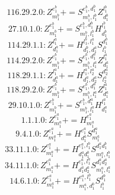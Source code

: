\documentclass[letterpaper,10pt,fleqn,leqno,onecolumn]{article}
\begin{document}
\begin{equation} \;\;\;\;\;\;  116.29.2.0: Z^{e_{1}^{b}}_{m_{1}^{b}}+=S^{e_{1}^{b},d_{1}^{b}}_{m_{1}^{b},l_{1}^{b}}Z^{l_{1}^{b}}_{d_{1}^{b}} \end{equation}
\begin{equation} \;\;\;\;\;\;  27.10.1.0: Z^{e_{1}^{b}}_{m_{1}^{b}}+=S^{e_{1}^{b},d_{1}^{b}}_{m_{1}^{b},l_{1}^{b}}H^{l_{1}^{b}}_{d_{1}^{b}} \end{equation}
\begin{equation} \;\;\;\;\;\;  114.29.1.1: Z^{l_{1}^{a}}_{d_{1}^{a}}+=H^{l_{1}^{b},l_{1}^{a}}_{d_{1}^{b},d_{1}^{a}}S^{d_{1}^{b}}_{l_{1}^{b}} \end{equation}
\begin{equation} \;\;\;\;\;\;  114.29.2.0: Z^{e_{1}^{b}}_{m_{1}^{b}}+=S^{e_{1}^{b},d_{1}^{a}}_{m_{1}^{b},l_{1}^{a}}Z^{l_{1}^{a}}_{d_{1}^{a}} \end{equation}
\begin{equation} \;\;\;\;\;\;  118.29.1.1: Z^{l_{1}^{a}}_{d_{1}^{a}}+=H^{l_{1}^{a},l_{2}^{a}}_{d_{1}^{a},d_{2}^{a}}S^{d_{2}^{a}}_{l_{2}^{a}} \end{equation}
\begin{equation} \;\;\;\;\;\;  118.29.2.0: Z^{e_{1}^{b}}_{m_{1}^{b}}+=S^{e_{1}^{b},d_{1}^{a}}_{m_{1}^{b},l_{1}^{a}}Z^{l_{1}^{a}}_{d_{1}^{a}} \end{equation}
\begin{equation} \;\;\;\;\;\;  29.10.1.0: Z^{e_{1}^{b}}_{m_{1}^{b}}+=S^{e_{1}^{b},d_{1}^{a}}_{m_{1}^{b},l_{1}^{a}}H^{l_{1}^{a}}_{d_{1}^{a}} \end{equation}
\begin{equation} \;\;\;\;\;\;  1.1.1.0: Z^{e_{1}^{a}}_{m_{1}^{a}}+=H^{e_{1}^{a}}_{m_{1}^{a}} \end{equation}
\begin{equation} \;\;\;\;\;\;  9.4.1.0: Z^{e_{1}^{a}}_{m_{1}^{a}}+=H^{e_{1}^{a}}_{d_{1}^{a}}S^{d_{1}^{a}}_{m_{1}^{a}} \end{equation}
\begin{equation} \;\;\;\;\;\;  33.11.1.0: Z^{e_{1}^{a}}_{m_{1}^{a}}+=H^{e_{1}^{a},l_{1}^{b}}_{d_{1}^{a}d_{1}^{b}}S^{d_{1}^{a}d_{1}^{b}}_{m_{1}^{a},l_{1}^{b}} \end{equation}
\begin{equation} \;\;\;\;\;\;  34.11.1.0: Z^{e_{1}^{a}}_{m_{1}^{a}}+=H^{e_{1}^{a},l_{1}^{a}}_{d_{1}^{a}d_{2}^{a}}S^{d_{1}^{a}d_{2}^{a}}_{m_{1}^{a},l_{1}^{a}} \end{equation}
\begin{equation} \;\;\;\;\;\;  14.6.1.0: Z^{e_{1}^{a}}_{m_{1}^{a}}+=H^{e_{1}^{a},l_{1}^{b}}_{m_{1}^{a},d_{1}^{b}}S^{d_{1}^{b}}_{l_{1}^{b}} \end{equation}
\end{document}
